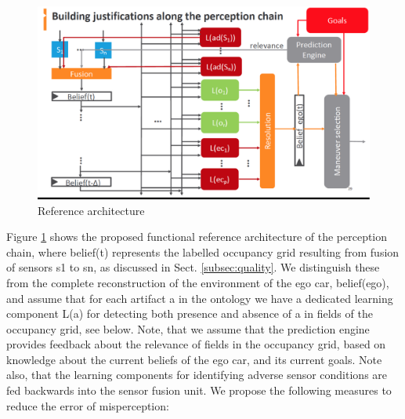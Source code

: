 \begin{figure}
    \centering
    \includegraphics[width=\textwidth]{fig2.eps}
    \caption{Reference architecture}
    \label{fig:architecture}
\end{figure}
Figure \ref{fig:architecture} shows the proposed functional reference architecture of the perception chain, where belief(t) represents the labelled occupancy grid resulting from fusion of sensors s1 to sn, as discussed in Sect. \ref{subsec:quality}. We distinguish these from the complete reconstruction of the environment of the ego car, belief(ego), and assume that for each artifact  a in the ontology we have a dedicated learning component  L(a) for detecting both presence and absence of a in fields of the occupancy grid, see below. Note, that we assume that the prediction engine provides feedback about the relevance of fields in the occupancy grid, based on knowledge about the current beliefs of the ego car, and its current goals. Note also, that the learning components for identifying adverse sensor conditions are fed backwards into the sensor fusion unit. We propose the following measures to reduce the error of misperception:
